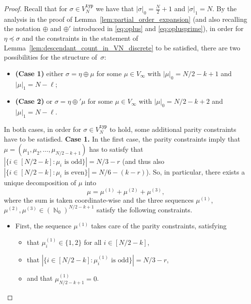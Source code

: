 \documentclass[11pt]{article}
\numberwithin{equation}{section}
\DeclareMathOperator{\N}{\mathbb{N}} %
\theoremstyle{definition}
\begin{document}
\begin{proof}
Recall that for $\sigma \in V_{N}^{\mathtt{typ}}$ we have that $|\sigma|_{0} = \frac{N}{2} + 1$ and $|\sigma|_{1} = N$. 
By the analysis in the proof of Lemma~\ref{lem:partial_order_expansion} (and also recalling the notation $\oplus$ and $\oplus'$ introduced in \eqref{eq:oplus} and \eqref{eq:oplusprime}), 
in order for $\eta \preccurlyeq \sigma$ and the constraints in the statement of Lemma~\ref{lem:descendant_count_in_VN_discrete} to be satisfied, there are two possibilities for the structure of~$\sigma$: 
\begin{itemize}
\item[] \textbf{(Case 1)} either $\sigma = \eta \oplus \mu$ for some $\mu \in V_{\infty}$ with 
$\left| \mu \right|_{0} = N/2 - k + 1$ 
and $\left| \mu \right|_{1} = N - \ell$;
\item[] \textbf{(Case 2)} or $\sigma = \eta \oplus' \mu$ for some $\mu \in V_{\infty}$ with 
$\left| \mu \right|_{0} = N/2 - k + 2$ 
and $\left| \mu \right|_{1} = N - \ell$.
\end{itemize}
In both cases, in order for $\sigma \in V_{N}^{\mathtt{typ}}$ to hold, some additional parity constraints have to be satisfied.
\textbf{Case 1.} 
In the first case, the parity constraints imply that  
$\mu = (\mu_{1}, \mu_{2}, \ldots, \mu_{N/2 - k + 1})$ 
has to satisfy that 
$|\{ i \in [N/2 - k] : \mu_{i} \text{ is odd} \}| = N/3 - r$ 
(and thus also 
$|\{ i \in [N/2 - k] : \mu_{i} \text{ is even} \}| = N/6 - (k-r)$). 
So, in particular, there exists a unique decomposition of $\mu$ into 
\[
\mu=\mu^{(1)} + \mu^{(2)} + \mu^{(3)},
\]
where the sum is taken coordinate-wise and the three sequences $\mu^{(1)}$, $\mu^{(2)}, \mu^{(3)} \in (\N_{0})^{N/2 -k +1}$ satisfy the following constraints.

\begin{itemize}
\item First, the sequence $\mu^{(1)}$ takes care of the parity constraints, 
satisfying 
\begin{itemize}
    \item that 
$\mu^{(1)}_{i} \in \{1,2\}$ for all $i \in [N/2-k]$, 
    \item that 
$|\{ i \in [N/2 - k] : \mu_{i}^{(1)} \text{ is odd} \}| = N/3 - r$, 
    \item and that 
$\mu^{(1)}_{N/2-k+1} = 0$.
\end{itemize}


\end{itemize}
\end{proof}
\end{document}
